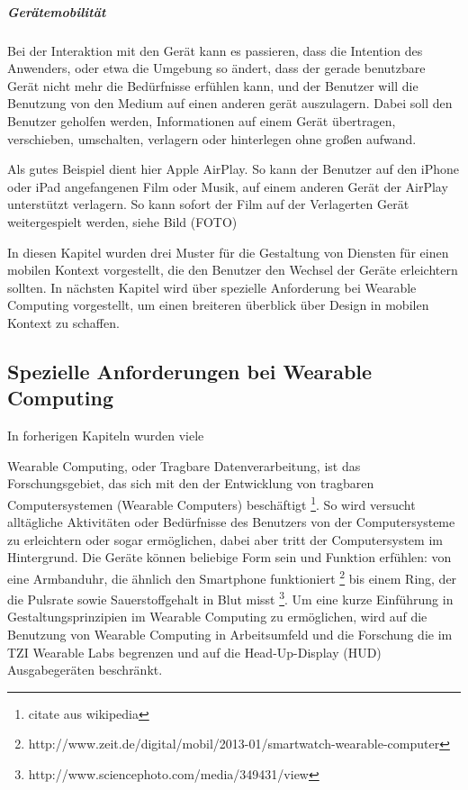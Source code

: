 \subparagraph{Gerätemobilität}

Bei der Interaktion mit den Gerät kann es passieren, dass die Intention des Anwenders, oder etwa die Umgebung so ändert, dass der gerade benutzbare Gerät nicht mehr die Bedürfnisse erfühlen kann, und der Benutzer will die Benutzung von den Medium auf einen anderen gerät auszulagern. Dabei soll den Benutzer geholfen werden, Informationen auf einem Gerät übertragen, verschieben, umschalten, verlagern oder hinterlegen ohne großen aufwand.

Als gutes Beispiel dient hier Apple AirPlay. So kann der Benutzer auf den iPhone oder iPad angefangenen Film oder Musik, auf einem anderen Gerät der AirPlay unterstützt verlagern. So kann sofort der Film auf der Verlagerten Gerät weitergespielt werden, siehe Bild (FOTO)
\newline

In diesen Kapitel wurden drei Muster für die Gestaltung von Diensten für einen mobilen Kontext vorgestellt, die den Benutzer den Wechsel der Geräte erleichtern sollten. In nächsten Kapitel wird über spezielle Anforderung bei Wearable Computing vorgestellt, um einen breiteren überblick über Design in mobilen Kontext zu schaffen.

\subsection{Spezielle Anforderungen bei Wearable Computing} 
\label{sub:wearable_computers}

In forherigen Kapiteln wurden viele 

Wearable Computing, oder Tragbare Datenverarbeitung, ist das Forschungsgebiet, das sich mit den der Entwicklung von tragbaren Computersystemen (Wearable Computers) beschäftigt \footnote{citate aus wikipedia }. So wird versucht alltägliche Aktivitäten oder Bedürfnisse des Benutzers  von der Computersysteme zu erleichtern oder sogar ermöglichen, dabei aber tritt der Computersystem im Hintergrund. Die Geräte können beliebige Form sein und Funktion erfühlen: von eine Armbanduhr, die ähnlich den Smartphone funktioniert \footnote{http://www.zeit.de/digital/mobil/2013-01/smartwatch-wearable-computer} bis einem  Ring, der die Pulsrate sowie Sauerstoffgehalt in Blut misst \footnote{http://www.sciencephoto.com/media/349431/view}.  Um eine kurze Einführung in Gestaltungsprinzipien im Wearable Computing zu ermöglichen, wird auf die Benutzung von Wearable Computing in Arbeitsumfeld und die Forschung die im TZI Wearable Labs begrenzen und auf die Head-Up-Display (HUD) Ausgabegeräten beschränkt.

